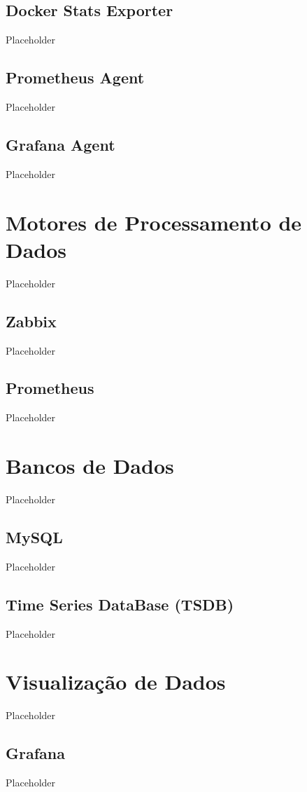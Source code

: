 \subsection{Docker Stats Exporter}
Placeholder

\subsection{Prometheus Agent}
Placeholder

\subsection{Grafana Agent}
Placeholder

\section{Motores de Processamento de Dados}
Placeholder

\subsection{Zabbix}
Placeholder

\subsection{Prometheus}
Placeholder

\section{Bancos de Dados}
Placeholder

\subsection{MySQL}
Placeholder

\subsection{Time Series DataBase (TSDB)}
Placeholder

\section{Visualização de Dados}
Placeholder

\subsection{Grafana}
Placeholder

